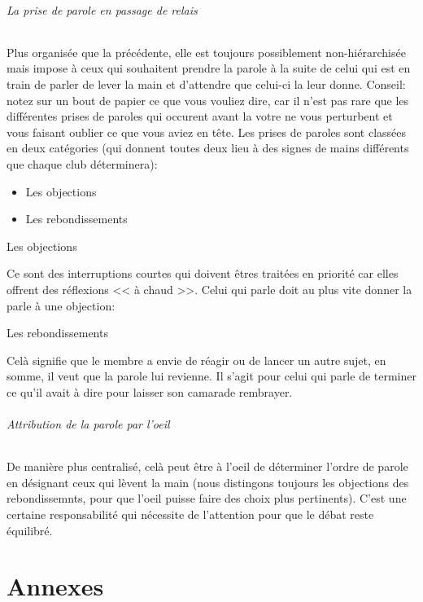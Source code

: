 \documentclass[a4paper,12pt]{article}
\begin{document}
\paragraph{La prise de parole en passage de relais}
Plus organisée que la précédente, elle est toujours possiblement non-hiérarchisée mais impose à ceux qui souhaitent prendre la parole à la suite de celui qui est en train de parler de lever la main et d'attendre que celui-ci la leur donne. Conseil: notez sur un bout de papier ce que vous vouliez dire, car il n'est pas rare que les différentes prises de paroles qui occurent avant la votre ne vous perturbent et vous faisant oublier ce que vous aviez en tête. Les prises de paroles sont classées en deux catégories (qui donnent toutes deux lieu à des signes de mains différents que chaque club déterminera):
\begin{itemize}
 \item Les objections
 \item Les rebondissements
\end{itemize}
\subparagraph{Les objections}
Ce sont des interruptions courtes qui doivent êtres traitées en priorité car elles offrent des réflexions << à chaud >>. Celui qui parle doit au plus vite donner la parle à une objection:
\subparagraph{Les rebondissements}
Celà signifie que le membre a envie de réagir ou de lancer un autre sujet, en somme, il veut que la parole lui revienne. Il s'agit pour celui qui parle de terminer ce qu'il avait à dire pour laisser son camarade rembrayer.
\paragraph{Attribution de la parole par l'oeil}
De manière plus centralisé, celà peut être à l'oeil de déterminer l'ordre de parole en désignant ceux qui lèvent la main (nous distingons toujours les objections des rebondissemnts, pour que l'oeil puisse faire des choix plus pertinents). C'est une certaine responsabilité qui nécessite de l'attention pour que le débat reste équilibré.



\newpage
\part{Annexes}
\end{document}
